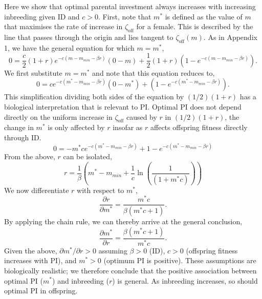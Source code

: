 \documentclass[10pt,letterpaper]{article}
\begin{document}
Here we show that optimal parental investment always increases with increasing inbreeding given ID and $c>0$. First, note that $m^{*}$ is defined as the value of $m$ that maximises the rate of increase in $\zeta_{\textrm{off}}$ for a female. This is described by the line that passes through the origin and lies tangent to $\zeta_{\textrm{off}}(m)$. As in Appendix 1, we have the general equation for which $m=m^{*}$,
\begin{equation}
0 = \frac{c}{2} \left(1+r\right)e^{-c\left(m-m_{min}-\beta r\right)}\left(0-m\right) + \frac{1}{2}\left(1+r\right)\left(1-e^{-c\left(m-m_{min}-\beta r\right)}\right).
\end{equation}
We first substitute $m=m^{*}$ and note that this equation reduces to,
\begin{equation}
0 = c e^{-c\left(m^{*}-m_{min}-\beta r\right)}\left(0-m^{*}\right) + \left(1-e^{-c\left(m^{*}-m_{min}-\beta r\right)}\right). 
\end{equation}
This simplification dividing both sides of the equation by $(1/2)(1+r)$ has a biological interpretation that is relevant to PI. Optimal PI does not depend directly on the uniform increase in $\zeta_{\textrm{off}}$ caused by $r$ in $(1/2)(1+r)$, the change in $m^{*}$ is only affected by $r$ insofar as $r$ affects offspring fitness directly through ID. %
\begin{equation}
0 = -m^{*} c e^{-c\left(m^{*}-m_{min}-\beta r\right)} + 1-e^{-c\left(m^{*}-m_{min}-\beta r\right)}
\end{equation}
From the above, $r$ can be isolated,
\begin{equation}
r = \frac{1}{\beta}\left(m^{*} - m_{min} + \frac{1}{c}\ln\left(\frac{1}{\left(1 + m^{*} c\right)}\right)\right)
\end{equation}
We now differentiate $r$ with respect to $m^{*}$,
\begin{equation}
\frac{\partial r}{\partial m^{*}} = \frac{m^{*} c}{\beta \left(m^{*} c + 1\right)}. 
\end{equation}
By applying the chain rule, we can thereby arrive at the general conclusion,
\begin{equation}
\frac{\partial m^{*}}{\partial r} = \frac{\beta \left(m^{*} c + 1\right)}{m^{*} c}. 
\end{equation} 
Given the above, $\partial m^{*} / \partial r > 0$ assuming $\beta>0$ (ID), $c>0$ (offspring fitness increases with PI), and $m^{*}>0$ (optimum PI is positive). These assumptions are biologically realistic; we therefore conclude that the positive association between optimal PI ($m^{*}$) and inbreeding ($r$) is general. As inbreeding increases, so should optimal PI in offspring.
\end{document}
